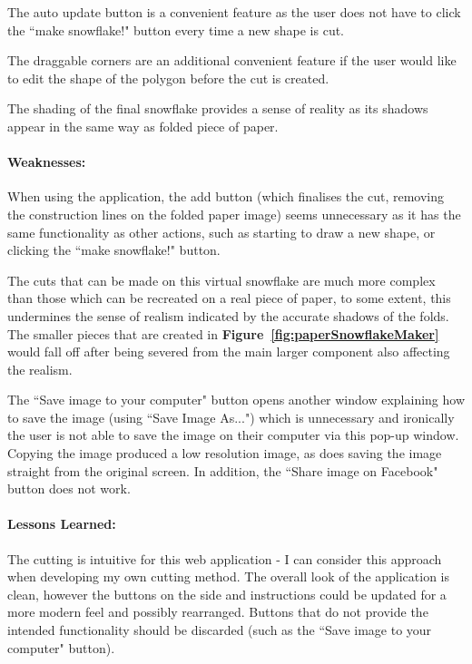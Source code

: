 \documentclass[11pt]{article}
\begin{document}
                The auto update button is a convenient feature as the user does not have to click the ``make snowflake!" button every time a new shape is cut. 
                
                The draggable corners are an additional convenient feature if the user would like to edit the shape of the polygon before the cut is created.
                 
                 The shading of the final snowflake provides a sense of reality as its shadows appear in the same way as folded piece of paper.
                 
                \paragraph{Weaknesses:}
                When using the application, the add button (which finalises the cut, removing the construction lines on the folded paper image) seems unnecessary as it has the same functionality as other actions, such as starting to draw a new shape, or clicking the ``make snowflake!" button.
                
                The cuts that can be made on this virtual snowflake are much more complex than those which can be recreated on a real piece of paper, to some extent, this undermines the sense of realism indicated by the accurate shadows of the folds. The smaller pieces that are created in \textbf{Figure~\ref{fig:paperSnowflakeMaker}} would fall off after being severed from the main larger component also affecting the realism.
                
                The ``Save image to your computer" button opens another window explaining how to save the image (using ``Save Image As...") which is unnecessary and ironically the user is not able to save the image on their computer via this pop-up window. Copying the image produced a low resolution image, as does saving the image straight from the original screen. In addition, the ``Share image on Facebook" button does not work.
            
                \paragraph{Lessons Learned:}
                The cutting is intuitive for this web application - I can consider this approach when developing my own cutting method. The overall look of the application is clean, however the buttons on the side and instructions could be updated for a more modern feel and possibly rearranged. Buttons that do not provide the intended functionality should be discarded (such as the ``Save image to your computer" button).
                
\end{document}
